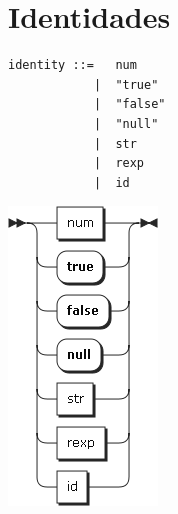 \section{Identidades}
\begin{multicols}{2}
\begin{lstlisting}[style=nonumbers]      
identity ::=   num
            |  "true"
            |  "false"
            |  "null"
            |  str
            |  rexp
            |  id 
\end{lstlisting}  
\columnbreak	
\begin{center}
\includegraphics[scale=0.4]{diagram/identity.png} \\
\end{center}
\end{multicols}
